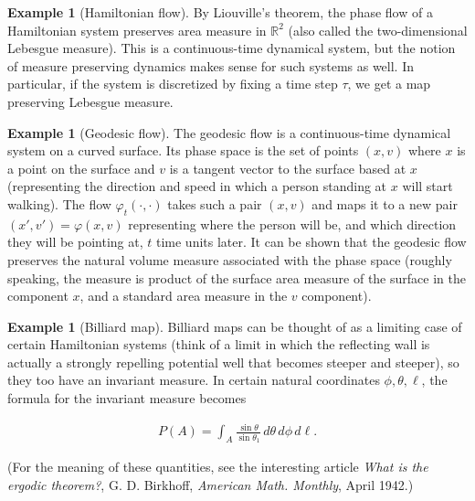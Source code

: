 \documentclass[11pt]{report}
\theoremstyle{plain}
\theoremstyle{definition}
\newtheorem{example}[thm]{Example}
\begin{document}
\begin{example}[Hamiltonian flow]
By Liouville's theorem, the phase flow of a
Hamiltonian system preserves area measure in
$\mathbb{R}^2$ (also called the two-dimensional
Lebesgue measure). This is a continuous-time dynamical
system, but the notion of measure preserving dynamics
makes sense for such systems as well. In particular,
if the system is discretized by fixing a time step
$\tau$, we get a map preserving Lebesgue measure.
\end{example}

\begin{example}[Geodesic flow]
The geodesic flow is a continuous-time dynamical
system on a curved surface. Its phase space is the set
of points $(x,v)$ where $x$ is a point on the surface
and $v$ is a tangent vector to the surface based at
$x$ (representing the direction and speed in which a
person standing at $x$ will start walking). The flow
$\varphi_t(\cdot,\cdot)$ takes such a pair $(x,v)$ and
maps it to a new pair $(x',v')=\varphi(x,v)$
representing where the person will be, and which
direction they will be pointing at, $t$ time units
later. It can be shown that the geodesic flow
preserves the natural volume measure associated with
the phase space (roughly speaking, the measure is
product of the surface area measure of the surface in
the component $x$, and a standard area measure in the
$v$ component).
\end{example}

\begin{example}[Billiard map]
Billiard maps can be thought of as a limiting case of
certain Hamiltonian systems (think of a limit in which
the reflecting wall is actually a strongly repelling
potential well that becomes steeper and steeper), so
they too have an invariant measure. In certain natural
coordinates $\phi, \theta, \ell$, the formula for the
invariant measure becomes

\begin{align*}
P(A) = \int_A \frac{\sin \theta}{\sin \theta_1}\, d\theta\, d\phi\, d\ell.
\end{align*}

\noindent (For the meaning of these quantities, see the
interesting article \emph{What is the ergodic theorem?}, G.
D. Birkhoff, \emph{American Math. Monthly}, April 1942.)
\end{example}
\end{document}
